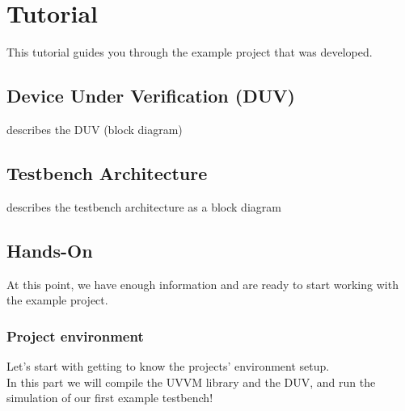 \section{Tutorial}

This tutorial guides you through the example project that was developed.

\subsection{Device Under Verification (DUV)}

describes the DUV (block diagram)

\subsection{Testbench Architecture}

describes the testbench architecture as a block diagram

\subsection{Hands-On}

At this point, we have enough information and are ready to start working with the example project.

\subsubsection{Project environment}

Let's start with getting to know the projects' environment setup. \\
In this part we will compile the UVVM library and the DUV, and run the simulation of our first example testbench!

